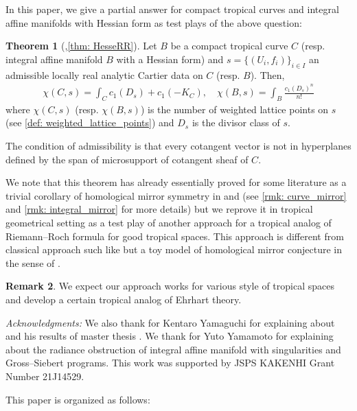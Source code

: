 \documentclass[a4paper,dvipdfmx,reqno,12pt]{amsart}
\theoremstyle{definition}
\newtheorem{Thm}{Theorem}[section]
\newtheorem{Rmk}[Thm]{Remark}
\numberwithin{equation}{section}
\begin{document}
In this paper, we give a partial answer for compact tropical curves 
and integral affine manifolds with Hessian form
as test plays of the above question:

\begin{Thm}[{,\cref{thm: HesseRR}}] \label{thm: main}
Let $B$ be a compact tropical curve $C$ (resp. integral 
affine manifold $B$
with a Hessian form) and $s=\{(U_i,f_i)\}_{i\in I}$ an admissible 
locally real analytic 
Cartier data on $C$ (resp. $B$). Then,
\begin{align}
\chi(C,s)=\int_C c_1(D_s)+c_1(-K_C), \quad \chi(B,s)=\int_B \frac{c_1(D_s)^{n}}{n!}
\end{align}
where $\chi(C,s)$ (resp. $\chi(B,s)$) is the number of weighted lattice
points on $s$ (see \cref{def: weighted_lattice_points}) and $D_s$ is the divisor class of $s$.
\end{Thm}

The condition of admissibility is that every cotangent vector 
is not in hyperplanes defined by the span of microsupport of
cotangent sheaf of $C$. 


We note that this theorem has already essentially proved for some
literature as a trivial corollary of homological mirror symmetry 
in \cite{MR4301560} and \cite{auroux2022lagrangian} (see \cref{rmk: curve_mirror} and \cref{rmk: integral_mirror} 
for more details) but we reprove it in tropical  
geometrical setting as a test play of another approach 
for a tropical analog of Riemann--Roch formula for 
good tropical spaces. This approach is different
from classical approach such like 
\cite{MR2355607,gathmannRiemannRochTheoremTropical2008a,mikhalkinTropicalCurvesTheir2008a} but
a toy model of homological mirror conjecture in the sense
of \cite[{}]{auroux2022lagrangian}.

\begin{Rmk}
We expect our approach works for various style 
of tropical spaces and develop a certain tropical 
analog of Ehrhart theory. 
\end{Rmk}

\textit{Acknowledgments:}
We also thank for Kentaro Yamaguchi for explaining about
\cite{MR4234675} and his results of master thesis 
\cite{yamaguchimaster}. We thank for Yuto Yamamoto for
explaining about the radiance obstruction of integral 
affine manifold with singularities and Gross--Siebert
programs.
This work was supported by JSPS KAKENHI 
Grant Number 21J14529.

This paper is organized as follows:
\end{document}
